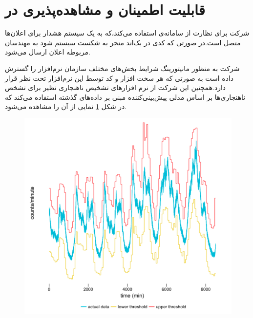 \section{قابلیت اطمینان و مشاهده‌پذیری در }
شرکت  برای نظارت از سامانه‌ی \cite{Nagios} استفاده می‌کند،که به یک سیستم هشدار برای اعلان‌ها متصل است.در صورتی که کدی در بک‌اند منجر به شکست سیستم شود به مهندسان مربوطه اعلان ارسال می‌شود.

شرکت  به منظور مانیتورینگ شرایط بخش‌های مختلف سازمان نرم‌افزار \cite{m3} را گسترش داده است به صورتی که هر سخت افزار و کد توسط این نرم‌افزار تحت نظر قرار دارد.همچنین این شرکت از نرم افزار‌های تشخیص ناهنجاری نظیر \cite{argos} برای تشخص ناهنجاری‌ها بر اساس مدلی پیش‌بینی‌کننده مبنی بر داده‌های گذشته استفاده می‌کند که در شکل \ref{fig:argos} نمایی از آن را مشاهده می‌شود.

\begin{figure}[h]
\centering
\includegraphics[scale=0.5]{argos.png}
\caption{}
\label{fig:argos}
\end{figure}








